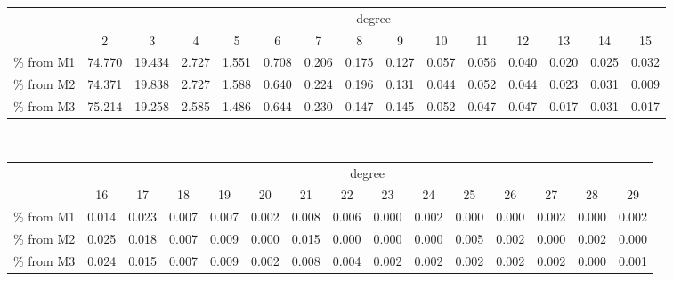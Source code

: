 \begin{tabular}{ | l | c | c | c | c | c | c | c | c | c | c | c | c | c | c |}
\cline{2-15}
\multicolumn{1}{c|}{}&\multicolumn{14}{c|}{degree}\\
\multicolumn{1}{c|}{}& 2 & 3 & 4 & 5 & 6 & 7 & 8 & 9 & 10 & 11 & 12 & 13 & 14 & 15\\
\hline
\% from M1 & 74.770 & 19.434 & 2.727 & 1.551 & 0.708 & 0.206 & 0.175 & 0.127 & 0.057 & 0.056 & 0.040 & 0.020 & 0.025 & 0.032\\
\% from M2 & 74.371 & 19.838 & 2.727 & 1.588 & 0.640 & 0.224 & 0.196 & 0.131 & 0.044 & 0.052 & 0.044 & 0.023 & 0.031 & 0.009\\
\% from M3 & 75.214 & 19.258 & 2.585 & 1.486 & 0.644 & 0.230 & 0.147 & 0.145 & 0.052 & 0.047 & 0.047 & 0.017 & 0.031 & 0.017\\
\hline
\end{tabular}\\
\begin{tabular}{ | l | c | c | c | c | c | c | c | c | c | c | c | c | c | c |}
\cline{2-15}
\multicolumn{1}{c|}{}&\multicolumn{14}{c|}{degree}\\
\multicolumn{1}{c|}{}& 16 & 17 & 18 & 19 & 20 & 21 & 22 & 23 & 24 & 25 & 26 & 27 & 28 & 29 \\
\hline
\% from M1 & 0.014  & 0.023  & 0.007 & 0.007 & 0.002 & 0.008 & 0.006 & 0.000 & 0.002 & 0.000 & 0.000 & 0.002 & 0.000 & 0.002\\
\% from M2 & 0.025  & 0.018  & 0.007 & 0.009 & 0.000 & 0.015 & 0.000 & 0.000 & 0.000 & 0.005 & 0.002 & 0.000 & 0.002 & 0.000\\
\% from M3 & 0.024  & 0.015  & 0.007 & 0.009 & 0.002 & 0.008 & 0.004 & 0.002 & 0.002 & 0.002 & 0.002 & 0.002 & 0.000 & 0.001\\
\hline
\end{tabular}
